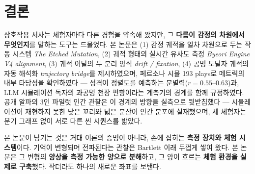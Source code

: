 \documentclass[11pt, a4paper]{article}
\begin{document}
\section{결론}
상호작용 서사는 체험자마다 다른 경험을 약속해 왔지만, 그 \textbf{다름이 감정의 차원에서 무엇인지}를 말하는 도구는 드물었다. 본 논문은 (1) 감정 궤적을 일차 차원으로 두는 작동 시스템 \textit{The Etched Mutation}, (2) 궤적 형태의 실시간 유사도 측정 \textit{Byeori Engine V4 alignment}, (3) 궤적 이탈의 두 분리 양식 \textit{drift / fixation}, (4) 공명 도달자 궤적의 자동 해석화 \textit{trajectory bridge}를 제시하였으며, 페르소나 시뮬 193 plays로 메트릭의 내부 타당성을 확인하였다 --- 성격이 정렬도를 예측하는 분별력($r=0.55$--$0.63$)과, LLM 시뮬레이션 독자의 과공명 천장 편향이라는 계측기의 경계를 함께 규정하였다. 공개 알파의 3인 파일럿 인간 관찰은 이 경계의 방향을 실측으로 뒷받침했다 --- 시뮬레이션이 재현하지 못한 낮은 꼬리와 넓은 분산이 인간 분포에 실재했으며, 세 체험자는 분기 그래프 없이 서로 다른 씬 시퀀스를 밟았다.

본 논문이 남기는 것은 거대 이론의 증명이 아니라, 손에 잡히는 \textbf{측정 장치와 체험 시스템}이다. 기억이 변형되며 전파된다는 관찰은 Bartlett 이래 두껍게 쌓여 왔다. 본 논문은 그 변형의 \textbf{양상을 측정 가능한 양으로 분해}하고, 그 양이 흐르는 \textbf{체험 환경을 실제로 구축}했다. 작더라도 하나의 새로운 좌표를 보탠다.

\end{document}
